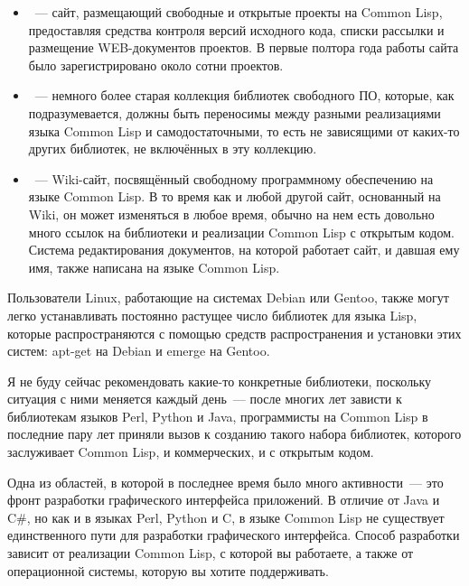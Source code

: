 \begin{itemize}
\item {}~--- сайт, размещающий свободные
  и открытые проекты на Common Lisp, предоставляя средства контроля версий исходного кода,
  списки рассылки и размещение WEB-документов проектов. В первые полтора года работы сайта
  было зарегистрировано около сотни проектов.

\item {}~--- немного более старая коллекция библиотек
  свободного ПО, которые, как подразумевается, должны быть переносимы между разными
  реализациями языка Common Lisp и самодостаточными, то есть не зависящими от каких-то
  других библиотек, не включённых в эту коллекцию.

\item {}~--- Wiki-сайт, посвящённый
  свободному программному обеспечению на языке Common Lisp. В то время как и любой другой
  сайт, основанный на Wiki, он может изменяться в любое время, обычно на нем есть довольно
  много ссылок на библиотеки и реализации Common Lisp с открытым кодом. Система
  редактирования документов, на которой работает сайт, и давшая ему имя, также написана на
  языке Common Lisp.
\end{itemize}

Пользователи Linux, работающие на системах Debian или Gentoo, также могут легко
устанавливать постоянно растущее число библиотек для языка Lisp, которые распространяются
с помощью средств распространения и установки этих систем: apt-get на Debian и emerge на
Gentoo.

Я не буду сейчас рекомендовать какие-то конкретные библиотеки, поскольку ситуация с ними
меняется каждый день~--- после многих лет зависти к библиотекам языков Perl, Python и
Java, программисты на Common Lisp в последние пару лет приняли вызов к созданию такого
набора библиотек, которого заслуживает Common Lisp, и коммерческих, и с открытым кодом.

Одна из областей, в которой в последнее время было много активности~--- это фронт
разработки графического интерфейса приложений. В отличие от Java и C\#, но как и в языках
Perl, Python и C, в языке Common Lisp не существует единственного пути для разработки
графического интерфейса. Способ разработки зависит от реализации Common Lisp, с которой вы
работаете, а также от операционной системы, которую вы хотите поддерживать.

